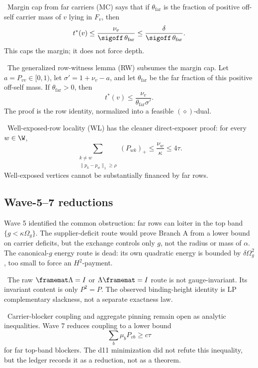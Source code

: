 \begin{lemma}
\provedbadge\ Margin cap from far carriers (MC) says that if \(\theta_{\mathrm{far}}\) is the
fraction of positive off-self
carrier mass of \(v\) lying in \(F_v\), then
\[
  t^*(v)\le \frac{\nu_v}{\sigoff\,\theta_{\mathrm{far}}}
  \le\frac{\delta}{\sigoff\,\theta_{\mathrm{far}}}.
\]
This caps the margin; it does not force depth.
\end{lemma}
\begin{lemma}
\provedbadge\ The generalized row-witness lemma (RW) subsumes the margin cap.  Let
\(a=P_{vv}\in[0,1)\), let
\(\sigma'=1+\nu_v-a\), and let \(\theta_{\mathrm{far}}\) be the far fraction of this positive
off-self mass.  If \(\theta_{\mathrm{far}}>0\), then
\[
  t^*(v)\le\frac{\nu_v}{\theta_{\mathrm{far}}\sigma'}.
\]
The proof is the row identity, normalized into a feasible \((\diamond)\)-dual.
\end{lemma}
\begin{lemma}
\modauditbadge\ Well-exposed-row locality (WL) has the cleaner direct-exposer proof: for
every \(w\in\W\),
\[
  \sum_{\substack{k\ne w\\ \|p_k-p_w\|_1\ge\rho}}(P_{wk})_+
  \le\frac{\nu_w}{\kappa}\le4\tau .
\]
Well-exposed vertices cannot be substantially financed by far rows.
\end{lemma}
\subsection{Wave-5--7 reductions}
Wave 5 identified the common obstruction: far rows can loiter in the top band
\(\{g<\kappa\Omega_g\}\).  The supplier-deficit route would prove Branch A from a lower
bound on carrier deficits, but the exchange controls only \(g\), not the radius or mass of
\(\alpha\).  The canonical-\(g\) energy route is dead: its own quadratic energy is bounded by
\(\delta\Omega_g^2\), too small to force an \(H^2\)-payment.
\begin{downgradedstatement}
\downgradedbadge\ The raw \(\framemat\Lambda=I\) or \(\Lambda\framemat=I\) route is not
gauge-invariant.  Its invariant content is only \(P^2=P\).  The observed binding-height
identity is LP complementary slackness, not a separate exactness law.
\end{downgradedstatement}
\begin{openproblem}
\openbadge\ Carrier-blocker coupling and aggregate pinning remain open as analytic
inequalities.  Wave 7 reduces coupling to a lower bound
\[
  \sum_b\mu_b P_{vb}\ge c\tau
\]
for far top-band blockers.  The d11 minimization did not refute this inequality, but the
ledger records it as a reduction, not as a theorem.
\end{openproblem}
